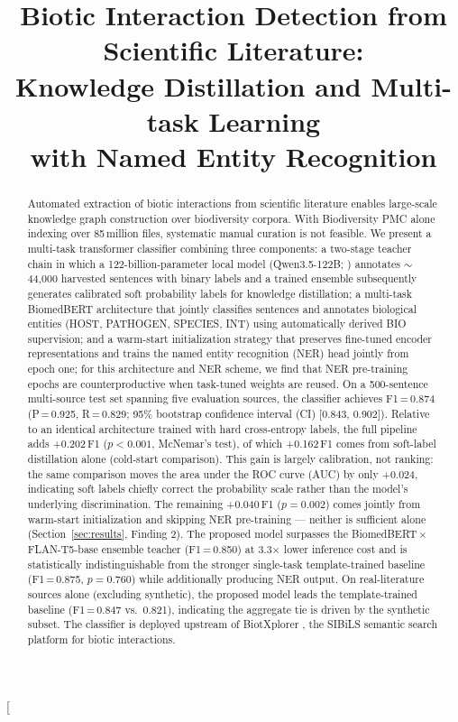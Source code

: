 \documentclass[11pt,twocolumn]{article}
\title{Biotic Interaction Detection from Scientific Literature:\\
Knowledge Distillation and Multi-task Learning\\
with Named Entity Recognition}
\author{}
\date{}
\begin{document}
\twocolumn[{%
\maketitle
\vspace{-1em}

\begin{abstract}
Automated extraction of biotic interactions from scientific literature
enables large-scale knowledge graph construction over biodiversity corpora.
With Biodiversity PMC \citep{biodiversitypmc2024} alone indexing over
85\,million files, systematic manual curation is not feasible.
We present a multi-task transformer classifier combining three components:
a two-stage teacher chain in which a 122-billion-parameter local model
(Qwen3.5-122B; \citealt{qwen2025technical}) annotates $\sim$44,000 harvested sentences with binary labels and
a trained ensemble subsequently generates calibrated soft probability labels
for knowledge distillation; a multi-task BiomedBERT architecture that jointly
classifies sentences and annotates biological entities (HOST, PATHOGEN,
SPECIES, INT) using automatically derived BIO supervision; and a warm-start
initialization strategy that preserves fine-tuned encoder representations
and trains the named entity recognition (NER) head jointly from epoch one;
for this architecture and NER scheme, we find that NER pre-training epochs
are counterproductive
when task-tuned weights are reused.
On a 500-sentence multi-source test set spanning five evaluation sources,
the classifier achieves F1\,=\,0.874 (P\,=\,0.925, R\,=\,0.829; 95\% bootstrap
confidence interval (CI) [0.843, 0.902]). Relative to an identical
architecture trained with hard cross-entropy labels, the full pipeline
adds +0.202\,F1 ($p{<}0.001$, McNemar's test), of which +0.162\,F1 comes
from soft-label distillation alone (cold-start comparison). This gain is
largely calibration, not ranking: the same comparison moves the area
under the ROC curve (AUC) by only +0.024, indicating soft labels chiefly
correct the probability scale rather than the model's underlying
discrimination. The remaining +0.040\,F1 ($p{=}0.002$) comes jointly
from warm-start initialization and skipping NER pre-training --- neither
is sufficient alone (Section~\ref{sec:results}, Finding 2). The proposed
model surpasses the
BiomedBERT\,$\times$\,FLAN-T5-base ensemble teacher (F1\,=\,0.850) at
3.3$\times$ lower inference cost and is statistically indistinguishable
from the stronger single-task template-trained baseline (F1\,=\,0.875,
$p{=}0.760$) while additionally producing NER output.
On real-literature sources alone (excluding synthetic), the proposed
model leads the template-trained baseline (F1\,=\,0.847 vs.\ 0.821),
indicating the aggregate tie is driven by the synthetic subset.
The classifier is deployed upstream of
BiotXplorer \citep{sibils2023biotxplorer}, the SIBiLS \citep{mottin2021sibils}
semantic search platform for biotic interactions.
\end{abstract}

}
\end{document}
